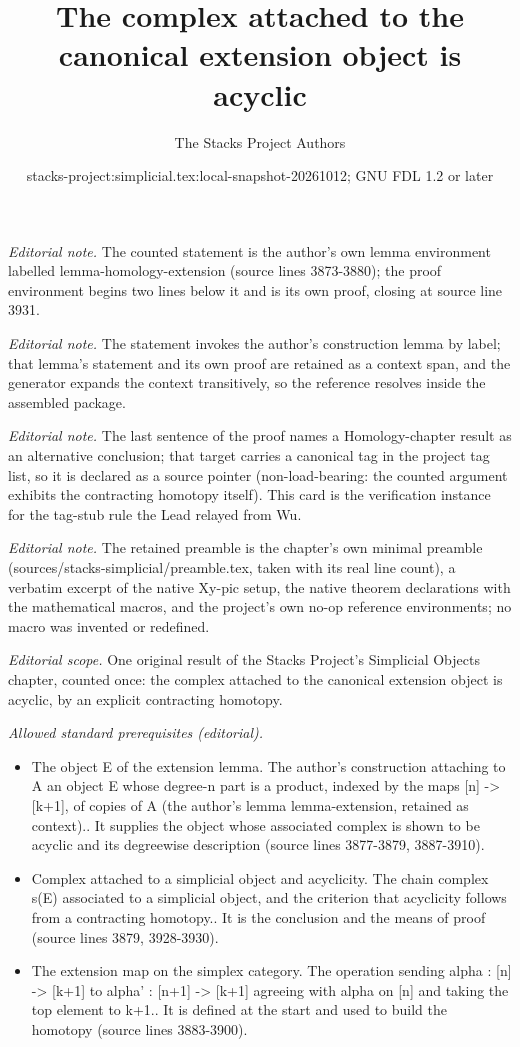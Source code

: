 \documentclass{stacks-project}
\title{The complex attached to the canonical extension object is acyclic}
\author{The Stacks Project Authors}
\date{stacks-project:simplicial.tex:local-snapshot-20261012; GNU FDL 1.2 or later}
\theoremstyle{plain}
\theoremstyle{definition}
\theoremstyle{remark}
\numberwithin{equation}{subsection}
\begin{document}
\maketitle
\noindent\textit{Editorial note.} The counted statement is the author's own lemma environment labelled lemma-homology-extension (source lines 3873-3880); the proof environment begins two lines below it and is its own proof, closing at source line 3931.\par\medskip
\noindent\textit{Editorial note.} The statement invokes the author's construction lemma by label; that lemma's statement and its own proof are retained as a context span, and the generator expands the context transitively, so the reference resolves inside the assembled package.\par\medskip
\noindent\textit{Editorial note.} The last sentence of the proof names a Homology-chapter result as an alternative conclusion; that target carries a canonical tag in the project tag list, so it is declared as a source pointer (non-load-bearing: the counted argument exhibits the contracting homotopy itself). This card is the verification instance for the tag-stub rule the Lead relayed from Wu.\par\medskip
\noindent\textit{Editorial note.} The retained preamble is the chapter's own minimal preamble (sources/stacks-simplicial/preamble.tex, taken with its real line count), a verbatim excerpt of the native Xy-pic setup, the native theorem declarations with the mathematical macros, and the project's own no-op reference environments; no macro was invented or redefined.\par\medskip
\noindent\textit{Editorial scope.} One original result of the Stacks Project's Simplicial Objects chapter, counted once: the complex attached to the canonical extension object is acyclic, by an explicit contracting homotopy.\par\medskip
\noindent\textit{Allowed standard prerequisites (editorial).}\begin{itemize}
\item The object E of the extension lemma. The author's construction attaching to A an object E whose degree-n part is a product, indexed by the maps [n] -> [k+1], of copies of A (the author's lemma lemma-extension, retained as context).. It supplies the object whose associated complex is shown to be acyclic and its degreewise description (source lines 3877-3879, 3887-3910).
\item Complex attached to a simplicial object and acyclicity. The chain complex s(E) associated to a simplicial object, and the criterion that acyclicity follows from a contracting homotopy.. It is the conclusion and the means of proof (source lines 3879, 3928-3930).
\item The extension map on the simplex category. The operation sending alpha : [n] -> [k+1] to alpha' : [n+1] -> [k+1] agreeing with alpha on [n] and taking the top element to k+1.. It is defined at the start and used to build the homotopy (source lines 3883-3900).
\end{itemize}\medskip
\end{document}
